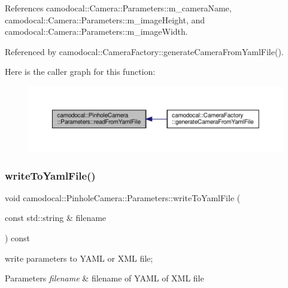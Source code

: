 References camodocal\+::\+Camera\+::\+Parameters\+::m\+\_\+camera\+Name, camodocal\+::\+Camera\+::\+Parameters\+::m\+\_\+image\+Height, and camodocal\+::\+Camera\+::\+Parameters\+::m\+\_\+image\+Width.



Referenced by camodocal\+::\+Camera\+Factory\+::generate\+Camera\+From\+Yaml\+File().

Here is the caller graph for this function\+:\nopagebreak
\begin{figure}[H]
\begin{center}
\leavevmode
\includegraphics[width=350pt]{classcamodocal_1_1PinholeCamera_1_1Parameters_a89d5834203e80ca6c09f60c47627c9a7_icgraph}
\end{center}
\end{figure}
\mbox{\label{classcamodocal_1_1PinholeCamera_1_1Parameters_ace74203c61ef30b57a2ba21184070bb5}} 
\subsubsection{\texorpdfstring{write\+To\+Yaml\+File()}{writeToYamlFile()}}
{\footnotesize\ttfamily void camodocal\+::\+Pinhole\+Camera\+::\+Parameters\+::write\+To\+Yaml\+File (\begin{DoxyParamCaption}\item[{const std\+::string \&}]{filename }\end{DoxyParamCaption}) const\hspace{0.3cm}{\ttfamily [virtual]}}



write parameters to Y\+A\+ML or X\+ML file; 


\begin{DoxyParams}{Parameters}
{\em filename} & filename of Y\+A\+ML of X\+ML file \\
\hline
\end{DoxyParams}


